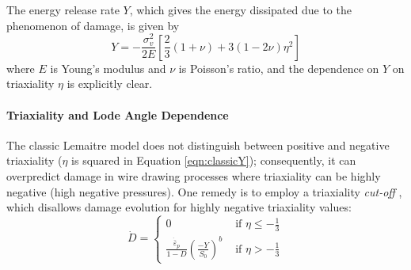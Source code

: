 \documentclass[sn-mathphys,Numbered]{sn-jnl}%
\newcommand{\bb}{\boldsymbol}
\begin{document}
The energy release rate $Y$, which gives the energy dissipated due to the phenomenon of damage, is given by \cite{lemaitre_engineering_2005}
\begin{equation} \label{eqn:classicY}
	Y
	=
	-\frac{\sigma_v^2}{2E}
	\left[
	\frac{2}{3} (1 + \nu) + 3 (1 - 2\nu) \eta^2
	\right]
\end{equation}
where $E$ is Young's modulus and $\nu$ is Poisson's ratio, and the dependence on $Y$ on triaxiality $\eta$ is explicitly clear.


\paragraph{Triaxiality and Lode Angle Dependence}

The classic Lemaitre model does not distinguish between positive and negative triaxiality ($\eta$ is squared in Equation \ref{eqn:classicY}); consequently, it can overpredict damage in wire drawing processes where triaxiality can be highly negative (high negative pressures).
One remedy is to employ a triaxiality \emph{cut-off} \cite{bouchard_enhanced_2011}, which disallows damage evolution for highly negative triaxiality values:
\begin{equation} \label{eq:triaxCutoff} %
	\dot{D} =
	\begin{cases}
		0 & \text { if } \eta \leq -\frac{1}{3}  \\
		\frac{\dot{\bar{\varepsilon}}_p}{1 - D}\left(\frac{-Y}{S_0}\right)^b 
		& \text { if } \eta>-\frac{1}{3}
	\end{cases}
\end{equation}
\end{document}
